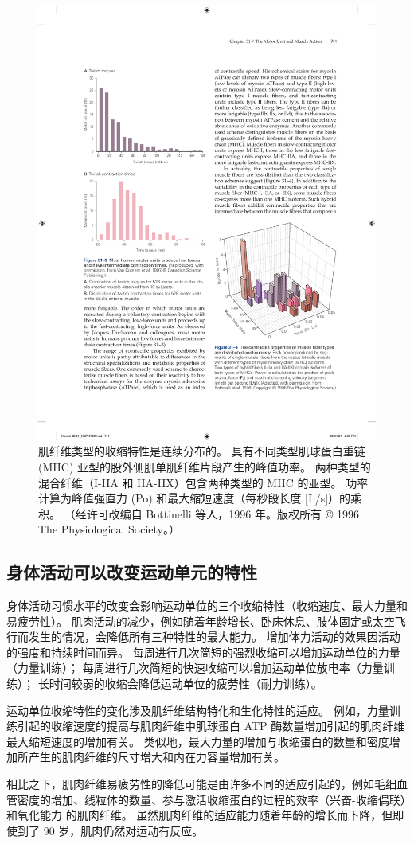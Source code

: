 \begin{figure}[htbp]
	\centering
	\includegraphics[width=0.5\linewidth]{chap31/fig_31_4}
	\caption{肌纤维类型的收缩特性是连续分布的。 具有不同类型肌球蛋白重链 (MHC) 亚型的股外侧肌单肌纤维片段产生的峰值功率。 两种类型的混合纤维（I-IIA 和 IIA-IIX）包含两种类型的 MHC 的亚型。 功率计算为峰值强直力 (Po) 和最大缩短速度（每秒段长度 [L/s]）的乘积。 （经许可改编自 Bottinelli 等人，1996 年。版权所有 © 1996 The Physiological Society。）}
	\label{fig:31_4}
\end{figure}


\subsection{身体活动可以改变运动单元的特性}
身体活动习惯水平的改变会影响运动单位的三个收缩特性（收缩速度、最大力量和易疲劳性）。 肌肉活动的减少，例如随着年龄增长、卧床休息、肢体固定或太空飞行而发生的情况，会降低所有三种特性的最大能力。 增加体力活动的效果因活动的强度和持续时间而异。 每周进行几次简短的强烈收缩可以增加运动单位的力量（力量训练）； 每周进行几次简短的快速收缩可以增加运动单位放电率（力量训练）； 长时间较弱的收缩会降低运动单位的疲劳性（耐力训练）。

运动单位收缩特性的变化涉及肌纤维结构特化和生化特性的适应。 例如，力量训练引起的收缩速度的提高与肌肉纤维中肌球蛋白 ATP 酶数量增加引起的肌肉纤维最大缩短速度的增加有关。 类似地，最大力量的增加与收缩蛋白的数量和密度增加所产生的肌肉纤维的尺寸增大和内在力容量增加有关。

相比之下，肌肉纤维易疲劳性的降低可能是由许多不同的适应引起的，例如毛细血管密度的增加、线粒体的数量、参与激活收缩蛋白的过程的效率（兴奋-收缩偶联）和氧化能力 的肌肉纤维。 虽然肌肉纤维的适应能力随着年龄的增长而下降，但即使到了 90 岁，肌肉仍然对运动有反应。

